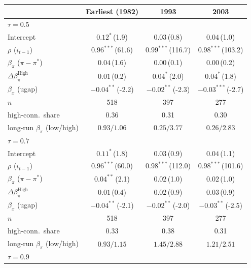 \setlength{\tabcolsep}{4pt}\scriptsize
\begin{tabular}{lccc}
\toprule
 & Earliest (1982) & 1993 & 2003 \\
\midrule
\multicolumn{4}{l}{\textit{$\tau=0.5$}} \\
Intercept & $0.12^{*}$\,{\scriptsize(1.9)} & $0.03$\,{\scriptsize(0.8)} & $0.04$\,{\scriptsize(1.0)} \\
$\rho$ ($i_{t-1}$) & $0.96^{***}$\,{\scriptsize(61.6)} & $0.99^{***}$\,{\scriptsize(116.7)} & $0.98^{***}$\,{\scriptsize(103.2)} \\
$\beta_\pi$ ($\pi-\pi^*$) & $0.04$\,{\scriptsize(1.6)} & $0.00$\,{\scriptsize(0.1)} & $0.00$\,{\scriptsize(0.2)} \\
$\Delta\beta_\pi^{\text{High}}$ & $0.01$\,{\scriptsize(0.2)} & $0.04^{*}$\,{\scriptsize(2.0)} & $0.04^{*}$\,{\scriptsize(1.8)} \\
$\beta_x$ (ugap) & $-0.04^{**}$\,{\scriptsize(-2.2)} & $-0.02^{**}$\,{\scriptsize(-2.3)} & $-0.03^{***}$\,{\scriptsize(-2.7)} \\
\addlinespace
$n$ & 518 & 397 & 277 \\
high-conn.\ share & 0.36 & 0.31 & 0.30 \\
long-run $\beta_\pi$ (low/high) & $0.93/1.06$ & $0.25/3.77$ & $0.26/2.83$ \\
\midrule
\multicolumn{4}{l}{\textit{$\tau=0.7$}} \\
Intercept & $0.11^{*}$\,{\scriptsize(1.8)} & $0.03$\,{\scriptsize(0.9)} & $0.04$\,{\scriptsize(1.1)} \\
$\rho$ ($i_{t-1}$) & $0.96^{***}$\,{\scriptsize(60.0)} & $0.98^{***}$\,{\scriptsize(112.0)} & $0.98^{***}$\,{\scriptsize(101.6)} \\
$\beta_\pi$ ($\pi-\pi^*$) & $0.04^{**}$\,{\scriptsize(2.1)} & $0.02$\,{\scriptsize(1.0)} & $0.02$\,{\scriptsize(1.0)} \\
$\Delta\beta_\pi^{\text{High}}$ & $0.01$\,{\scriptsize(0.4)} & $0.02$\,{\scriptsize(0.9)} & $0.03$\,{\scriptsize(0.9)} \\
$\beta_x$ (ugap) & $-0.04^{**}$\,{\scriptsize(-2.1)} & $-0.02^{**}$\,{\scriptsize(-2.0)} & $-0.03^{**}$\,{\scriptsize(-2.5)} \\
\addlinespace
$n$ & 518 & 397 & 277 \\
high-conn.\ share & 0.33 & 0.38 & 0.31 \\
long-run $\beta_\pi$ (low/high) & $0.93/1.15$ & $1.45/2.88$ & $1.21/2.51$ \\
\midrule
\multicolumn{4}{l}{\textit{$\tau=0.9$}} \\

\end{tabular}
